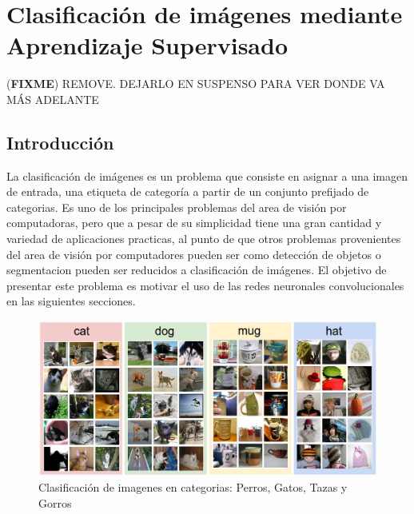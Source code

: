 \documentclass[a4paper,11pt,spanish]{book}
\newcommand*{\FIXME}[1]{{(\textbf{FIXME}) {#1}}}
\begin{document}
    \section{Clasificación de imágenes mediante Aprendizaje
      Supervisado}\FIXME{REMOVE. DEJARLO EN SUSPENSO PARA VER DONDE VA MÁS ADELANTE}
      \subsection{Introducción}
	La clasificación de imágenes es un problema que consiste en asignar a una imagen de entrada, una etiqueta de categoría a partir de un conjunto prefijado de categorias.
	Es uno de los principales problemas del area de visión por computadoras, pero que a pesar de su simplicidad tiene una gran cantidad y variedad de aplicaciones practicas,
	al punto de que otros problemas provenientes del area de visión por computadores pueden ser como detección de objetos o segmentacion pueden ser reducidos a clasificación de imágenes.
	El objetivo de presentar este problema es motivar el uso de las redes neuronales convolucionales en las siguientes secciones.
	\begin{figure}[h]
	  \includegraphics[scale=0.5]{./img/stanford_img_class.jpg}
	  \caption{Clasificación de imagenes en categorias: Perros, Gatos, Tazas y Gorros}
	  \label{fig:stanford_img_class}
	\end{figure}
\end{document}
